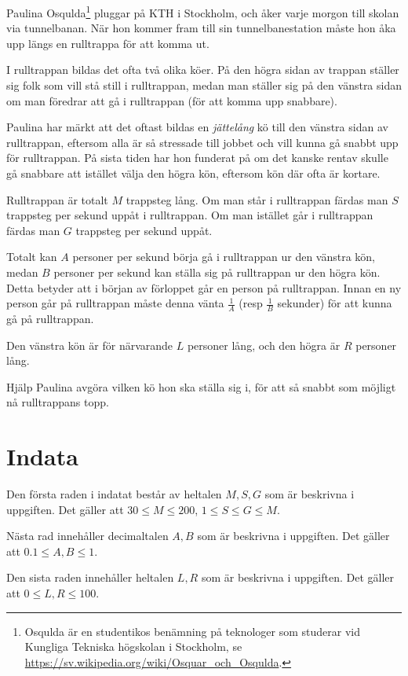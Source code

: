Paulina Osqulda\footnote{Osqulda är en studentikos benämning på teknologer som studerar vid Kungliga Tekniska högskolan i Stockholm, se \url{https://sv.wikipedia.org/wiki/Osquar_och_Osqulda}.} pluggar på KTH i Stockholm, och åker varje morgon till skolan via tunnelbanan.
När hon kommer fram till sin tunnelbanestation måste hon åka upp längs en rulltrappa för att komma ut.

I rulltrappan bildas det ofta två olika köer.
På den högra sidan av trappan ställer sig folk som vill stå still i rulltrappan, medan man ställer sig på den vänstra sidan om man föredrar att gå i rulltrappan (för att komma upp snabbare).

Paulina har märkt att det oftast bildas en \emph{jättelång} kö till den vänstra sidan av rulltrappan, eftersom alla är så stressade till jobbet och vill kunna gå snabbt upp för rulltrappan.
På sista tiden har hon funderat på om det kanske rentav skulle gå snabbare att istället välja den högra kön, eftersom kön där ofta är kortare.

Rulltrappan är totalt $M$ trappsteg lång.
Om man står i rulltrappan färdas man $S$ trappsteg per sekund uppåt i rulltrappan.
Om man istället går i rulltrappan färdas man $G$ trappsteg per sekund uppåt.

Totalt kan $A$ personer per sekund börja gå i rulltrappan ur den vänstra kön, medan $B$ personer per sekund kan ställa sig på rulltrappan ur den högra kön.
Detta betyder att i början av förloppet går en person på rulltrappan.
Innan en ny person går på rulltrappan måste denna vänta $\frac{1}{A}$ (resp $\frac{1}{B}$ sekunder) för att kunna gå på rulltrappan.

Den vänstra kön är för närvarande $L$ personer lång, och den högra är $R$ personer lång.

Hjälp Paulina avgöra vilken kö hon ska ställa sig i, för att så snabbt som möjligt nå rulltrappans topp.

\section*{Indata}
Den första raden i indatat består av heltalen $M, S, G$ som är beskrivna i uppgiften.
Det gäller att $30 \le M \le 200$, $1 \le S \le G \le M$.

Nästa rad innehåller decimaltalen $A, B$ som är beskrivna i uppgiften.
Det gäller att $0.1 \le A, B \le 1$.

Den sista raden innehåller heltalen $L, R$ som är beskrivna i uppgiften.
Det gäller att $0 \le L, R \le 100$.

